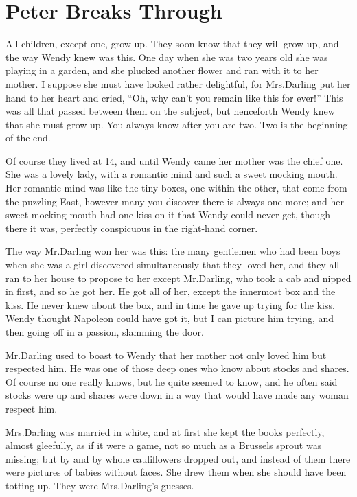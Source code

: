 
\chapter{Peter Breaks Through}

All children, except one, grow up.
They soon know that they will grow up,
and the way Wendy knew was this.
One day when she was two years old she was playing in a garden,
and she plucked another flower and ran with it to her mother.
I suppose she must have looked rather delightful,
for Mrs.\@ Darling put her hand to her heart and cried,
“Oh, why can't you remain like this for ever!”
This was all that passed between them on the subject,
but henceforth Wendy knew that she must grow up.
You always know after you are two.
Two is the beginning of the end.

Of course they lived at 14,
and until Wendy came her mother was the chief one.
She was a lovely lady, with a romantic mind and such a sweet mocking mouth.
Her romantic mind was like the tiny boxes, one within the other, that come from the puzzling East,
however many you discover there is always one more;
and her sweet mocking mouth had one kiss on it that Wendy could never get,
though there it was, perfectly conspicuous in the right-hand corner.

The way Mr.\@ Darling won her was this:
the many gentlemen who had been boys when she was a girl discovered simultaneously that they loved her,
and they all ran to her house to propose to her
except Mr.\@ Darling, who took a cab and nipped in first, and so he got her.
He got all of her, except the innermost box and the kiss.
He never knew about the box, and in time he gave up trying for the kiss.
Wendy thought Napoleon could have got it,
but I can picture him trying, and then going off in a passion, slamming the door.

Mr.\@ Darling used to boast to Wendy that her mother not only loved him but respected him.
He was one of those deep ones who know about stocks and shares.
Of course no one really knows, but he quite seemed to know,
and he often said stocks were up and shares were down in a way that would have made any woman respect him.

Mrs.\@ Darling was married in white,
and at first she kept the books perfectly, almost gleefully, as if it were a game,
not so much as a Brussels sprout was missing;
but by and by whole cauliflowers dropped out,
and instead of them there were pictures of babies without faces.
She drew them when she should have been totting up.
They were Mrs.\@ Darling's guesses.

